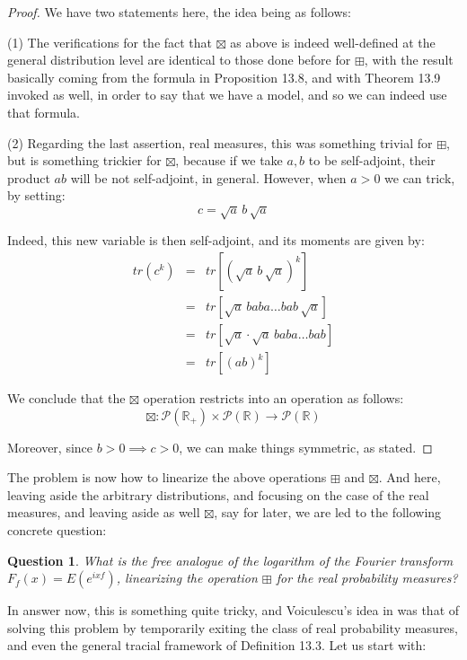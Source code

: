 \documentclass[12pt]{amsbook}
\newtheorem{question}[theorem]{Question}
\begin{document}
\begin{proof}
We have two statements here, the idea being as follows:

\medskip

(1) The verifications for the fact that $\boxtimes$ as above is indeed well-defined at the general distribution level are identical to those done before for $\boxplus$, with the result basically coming from the formula in Proposition 13.8, and with Theorem 13.9 invoked as well, in order to say that we have a model, and so we can indeed use that formula.

\medskip

(2) Regarding the last assertion, real measures, this was something trivial for $\boxplus$, but is something trickier for $\boxtimes$, because if we take $a,b$ to be self-adjoint, their product $ab$ will be not self-adjoint, in general. However, when $a>0$ we can trick, by setting:
$$c=\sqrt{a}\,b\,\sqrt{a}$$

Indeed, this new variable is then self-adjoint, and its moments are given by:
\begin{eqnarray*}
tr(c^k)
&=&tr[(\sqrt{a}\,b\,\sqrt{a})^k]\\
&=&tr[\sqrt{a}\,baba\ldots bab\,\sqrt{a}]\\
&=&tr[\sqrt{a}\cdot \sqrt{a}\,baba\ldots bab]\\
&=&tr[(ab)^k]
\end{eqnarray*}

We conclude that the $\boxtimes$ operation restricts into an operation as follows:
$$\boxtimes:\mathcal P(\mathbb R_+)\times\mathcal P(\mathbb R)\to\mathcal P(\mathbb R)$$

Moreover, since $b>0\implies c>0$, we can make things symmetric, as stated.
\end{proof}

The problem is now how to linearize the above operations $\boxplus$ and $\boxtimes$. And here, leaving aside the arbitrary distributions, and focusing on the case of the real measures, and leaving aside as well $\boxtimes$, say for later, we are led to the following concrete question:

\begin{question}
What is the free analogue of the logarithm of the Fourier transform $F_f(x)=E(e^{ixf})$, linearizing the operation $\boxplus$ for the real probability measures?
\end{question}

In answer now, this is something quite tricky, and Voiculescu's idea in \cite{vo1} was that of solving this problem by temporarily exiting the class of real probability measures, and even the general tracial framework of Definition 13.3. Let us start with:
\end{document}
